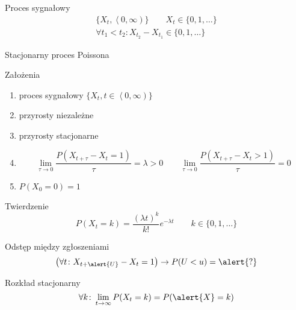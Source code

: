 \documentclass{mp}
\subtitle{Proces Poissona}
\begin{document}
\frame{\titlepage}
\begin{frame}{Proces sygnałowy}
\begin{gather*}
\{X_t, \left<0,\infty\right)\} \qquad X_t\in\{0,1,\ldots\} \\
\forall t_1<t_2: X_{t_2}-X_{t_1}\in\{0,1,\ldots\}
\end{gather*}
\end{frame}
\begin{frame}{Stacjonarny proces Poissona}
\begin{block}{Założenia}
\begin{enumerate}
\item<+-> proces sygnałowy $\{X_t,t\in\left<0,\infty\right)\}$
\item<+-> przyrosty niezależne
\item<+-> przyrosty stacjonarne
\item<+-> 
\[ \lim_{\tau\to 0} \frac{P(X_{t+\tau}-X_t=1)}{\tau}=\lambda >0 \qquad \lim_{\tau\to 0} \frac{P(X_{t+\tau}-X_{t}>1)}{\tau}=0 \]
\item<+-> $P(X_0=0)=1$
\end{enumerate}
\end{block}
\uncover<+->
{
\begin{block}{Twierdzenie}
\[ P(X_t=k)=\frac{(\lambda t)^k}{k!}e^{-\lambda t} \qquad k\in\{0,1,\ldots\} \]
\end{block}
}
\end{frame}
\begin{frame}{Odstęp między zgłoszeniami}
\[ \left( \forall t\colon X_{t+\alert{U}}-X_t=1 \right) \to P(U<u)=\alert{?} \]
\end{frame}
\begin{frame}{Rozkład stacjonarny}
\[ \forall k\colon \lim_{t\to\infty} P(X_t=k)=P(\alert{X}=k) \]
\end{frame}
\end{document}

